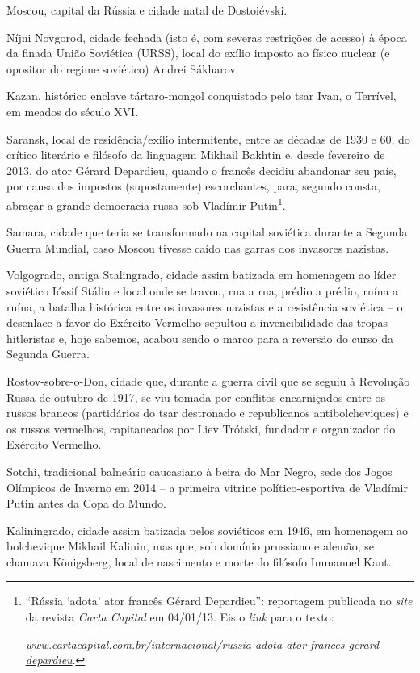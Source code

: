 Moscou, capital da Rússia e cidade natal de Dostoiévski.

Níjni Novgorod, cidade fechada (isto é, com severas restrições de
acesso) à época da finada União Soviética (URSS), local do exílio
imposto ao físico nuclear (e opositor do regime soviético) Andrei
Sákharov.

Kazan, histórico enclave tártaro-mongol conquistado pelo tsar Ivan, o
Terrível, em meados do século XVI.

Saransk, local de residência/exílio intermitente, entre as décadas de
1930 e 60, do crítico literário e filósofo da linguagem Mikhail Bakhtin
e, desde fevereiro de 2013, do ator Gérard Depardieu, quando o francês
decidiu abandonar seu país, por causa dos impostos (supostamente)
escorchantes, para, segundo consta, abraçar a grande democracia russa
sob Vladímir Putin\footnote{``Rússia `adota' ator francês Gérard
  Depardieu'': reportagem publicada no \emph{site} da revista
  \emph{Carta Capital} em 04/01/13. Eis o \emph{link} para o texto:

  \href{http://www.cartacapital.com.br/internacional/russia-adota-ator-frances-gerard-depardieu}{\emph{www.cartacapital.com.br/internacional/russia-adota-ator-frances-gerard-depardieu}}.}.

Samara, cidade que teria se transformado na capital soviética durante a
Segunda Guerra Mundial, caso Moscou tivesse caído nas garras dos
invasores nazistas.

Volgogrado, antiga Stalingrado, cidade assim batizada em homenagem ao
líder soviético Ióssif Stálin e local onde se travou, rua a rua, prédio
a prédio, ruína a ruína, a batalha histórica entre os invasores nazistas
e a resistência soviética -- o desenlace a favor do Exército Vermelho
sepultou a invencibilidade das tropas hitleristas e, hoje sabemos,
acabou sendo o marco para a reversão do curso da Segunda Guerra.

Rostov-sobre-o-Don, cidade que, durante a guerra civil que se seguiu à
Revolução Russa de outubro de 1917, se viu tomada por conflitos
encarniçados entre os russos brancos (partidários do tsar destronado e
republicanos antibolcheviques) e os russos vermelhos, capitaneados por
Liev Trótski, fundador e organizador do Exército Vermelho.

Sotchi, tradicional balneário caucasiano à beira do Mar Negro, sede dos
Jogos Olímpicos de Inverno em 2014 -- a primeira vitrine
político-esportiva de Vladímir Putin antes da Copa do Mundo.

Kaliningrado, cidade assim batizada pelos soviéticos em 1946, em
homenagem ao bolchevique Mikhail Kalinin, mas que, sob domínio prussiano
e alemão, se chamava Königsberg, local de nascimento e morte do filósofo
Immanuel Kant.

